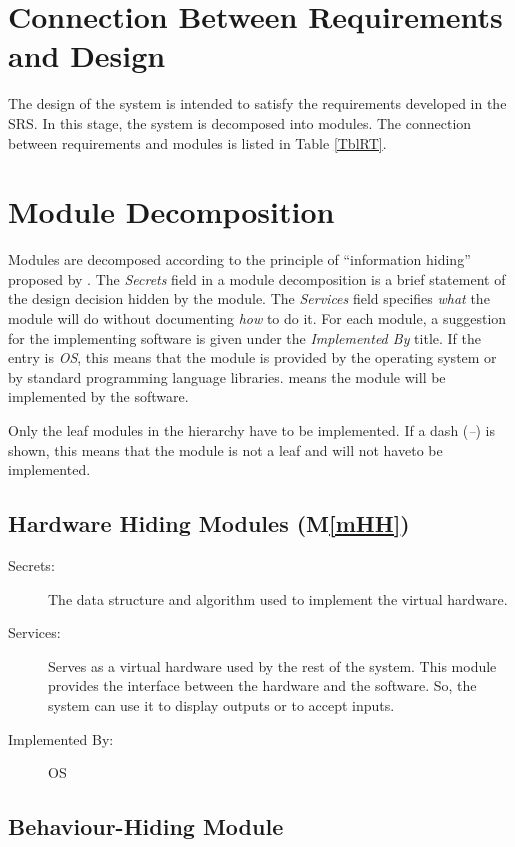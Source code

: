 \documentclass[12pt, titlepage]{article}
\newcommand{\mref}[1]{M\ref{#1}}
\begin{document}
\section{Connection Between Requirements and Design} \label{SecConnection}

The design of the system is intended to satisfy the requirements developed in
the SRS. In this stage, the system is decomposed into modules. The connection
between requirements and modules is listed in Table \ref{TblRT}.

\section{Module Decomposition} \label{SecMD}

Modules are decomposed according to the principle of ``information hiding''
proposed by \citet{ParnasEtAl1984}. The \emph{Secrets} field in a module
decomposition is a brief statement of the design decision hidden by the
module. The \emph{Services} field specifies \emph{what} the module will do
without documenting \emph{how} to do it. For each module, a suggestion for the
implementing software is given under the \emph{Implemented By} title. If the
entry is \emph{OS}, this means that the module is provided by the operating
system or by standard programming language libraries. \emph{\progname{}} means
the
module will be implemented by the \progname{} software.

Only the leaf modules in the hierarchy have to be implemented. If a dash
(\emph{--}) is shown, this means that the module is not a leaf and will not
haveto be implemented.

\subsection{Hardware Hiding Modules (\mref{mHH})}

\begin{description}
\item[Secrets:]The data structure and algorithm used to implement the virtual
  hardware.
\item[Services:]Serves as a virtual hardware used by the rest of the
  system. This module provides the interface between the hardware and the
  software. So, the system can use it to display outputs or to accept inputs.
\item[Implemented By:] OS
\end{description}

\subsection{Behaviour-Hiding Module}
\end{document}

